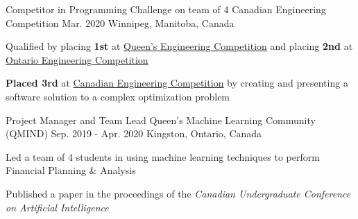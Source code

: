 
\begin{cventries}

  \cventry
    {Competitor in Programming Challenge on team of 4} %
    {Canadian Engineering Competition} %
    {Mar. 2020} %
    {Winnipeg, Manitoba, Canada} %
    {
      \begin{cvitems} %
        \item{Qualified by placing \textbf{1st} at \href{https://quengcomp.ca/}{Queen's Engineering Competition} and placing \textbf{2nd} at \href{https://www.oec2020.ca/}{Ontario Engineering Competition}}
        \item{\textbf{Placed 3rd} at \href{https://cfes.ca/cec/}{Canadian Engineering Competition} by creating and presenting a software solution to a complex optimization problem}
      \end{cvitems}
    }


  \cventry
    {Project Manager and Team Lead} %
    {Queen's Machine Learning Community (QMIND)} %
    {Sep. 2019 - Apr. 2020} %
    {Kingston, Ontario, Canada} %
    {
      \begin{cvitems} %
        \item{Led a team of 4 students in using machine learning techniques to perform Financial Planning \& Analysis}
        \item{Published a paper in the proceedings of the \textit{Canadian Undergraduate Conference on Artificial Intelligence}}
      \end{cvitems}
    }


\end{cventries}
